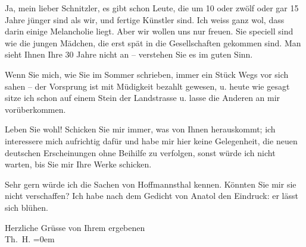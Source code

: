 \pstart
           Ja, mein lieber Schnitzler, es gibt
      schon Leute, die um 10 oder
      zwölf oder gar 15 Jahre jünger
      sind als wir, und fertige
      Künstler sind. Ich weiss ganz
      wol, dass darin einige Melancholie
      liegt. Aber wir wollen uns nur
      freuen. Sie speciell sind wie die
      jungen Mädchen, die erst spät
      in die Gesellschaften gekommen sind.
      Man sieht Ihnen Ihre 30 Jahre
      nicht an – verstehen Sie es im
      guten Sinn.\pend
           
\pstart
           Wenn Sie mich, wie Sie im Sommer
      schrieben, immer ein Stück Wegs
      vor sich sahen – der Vorsprung
      ist mit Müdigkeit bezahlt gewesen,
      u. heute wie gesagt sitze {\pb}ich schon auf einem Stein
      der Landstrasse u. lasse die
      Anderen an mir vorüberkommen.\pend
           
\pstart
           Leben Sie wohl! Schicken Sie
      mir immer, was von Ihnen
      herauskommt; ich interessere mich
      aufrichtig dafür und habe mir
      hier keine Gelegenheit, die neuen
      deutschen Erscheinungen  ohne
      Beihilfe zu verfolgen, sonst würde
      ich nicht warten, bis Sie mir
      Ihre Werke schicken.\pend
           
\pstart
           Sehr gern würde ich die Sachen
               von Hoffmannsthal kennen. Könnten
               Sie mir sie nicht verschaffen? Ich habe nach dem Gedicht von
               Anatol den Eindruck: er lässt
               sich blühen.\pend
           
\pstart
           Herzliche Grüsse von Ihrem ergebenen{\\[\baselineskip]}\spacefill\mbox{Th. H.}\pend
           \leftskip=0em{}\endnumbering{}
\begin{anhang}
\end{anhang}
      